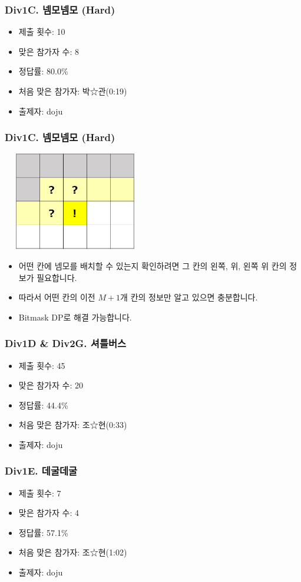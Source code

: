 \documentclass[xetex]{beamer}
\begin{document}
\begin{frame}
  \frametitle{Div1C. 넴모넴모 (Hard)}
  \begin{itemize}
    \item 제출 횟수: 10
    \item 맞은 참가자 수: 8
    \item 정답률: 80.0\%
    \item 처음 맞은 참가자: 박☆관(0:19)
    \item 출제자: doju
  \end{itemize}
\end{frame}

\begin{frame}
  \frametitle{Div1C. 넴모넴모 (Hard)}
  \begin{center}
    \includegraphics[width=0.4\textwidth]{nemo2-sol.png}
  \end{center}
  \begin{itemize}
    \item 어떤 칸에 넴모를 배치할 수 있는지 확인하려면 그 칸의 왼쪽, 위, 왼쪽 위 칸의 정보가 필요합니다.
    \item 따라서 어떤 칸의 이전 $M + 1$개 칸의 정보만 알고 있으면 충분합니다.
    \item Bitmask DP로 해결 가능합니다.
  \end{itemize}
\end{frame}

\begin{frame}
  \frametitle{Div1D \& Div2G. 셔틀버스}
  \begin{itemize}
    \item 제출 횟수: 45
    \item 맞은 참가자 수: 20
    \item 정답률: 44.4\%
    \item 처음 맞은 참가자: 조☆현(0:33)
    \item 출제자: doju
  \end{itemize}
\end{frame}

\begin{frame}
  \frametitle{Div1E. 데굴데굴}
  \begin{itemize}
    \item 제출 횟수: 7
    \item 맞은 참가자 수: 4
    \item 정답률: 57.1\%
    \item 처음 맞은 참가자: 조☆현(1:02)
    \item 출제자: doju
  \end{itemize}
\end{frame}
\end{document}
